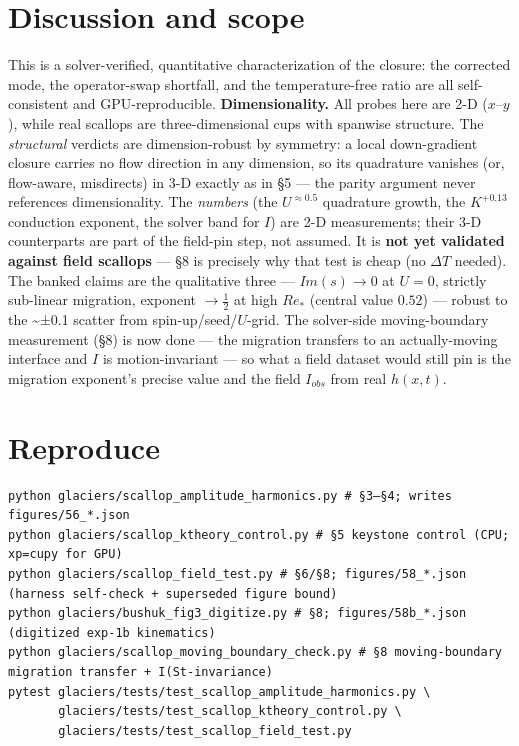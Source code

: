 \documentclass[tc, manuscript]{copernicus}
\begin{document}
\section{Discussion and scope}

This is a solver-verified, quantitative characterization of the closure: the corrected mode, the operator-swap shortfall, and the temperature-free ratio are all self-consistent and GPU-reproducible. \textbf{Dimensionality.} All probes here are 2-D ($x$--$y$), while real scallops are three-dimensional cups with spanwise structure. The \emph{structural} verdicts are dimension-robust by symmetry: a local down-gradient closure carries no flow direction in any dimension, so its quadrature vanishes (or, flow-aware, misdirects) in 3-D exactly as in §5 --- the parity argument never references dimensionality. The \emph{numbers} (the $U^{\approx 0.5}$ quadrature growth, the $K^{+0.13}$ conduction exponent, the solver band for $I$) are 2-D measurements; their 3-D counterparts are part of the field-pin step, not assumed. It is \textbf{not yet validated against field scallops} — §8 is precisely why that test is cheap (no $\Delta T$ needed). The banked claims are the qualitative three — $Im(s)\to 0$ at $U=0$, strictly sub-linear migration, exponent $\to \tfrac{1}{2}$ at high $Re_*$ (central value $0.52$) — robust to the \textasciitilde{}±0.1 scatter from spin-up/seed/$U$-grid. The solver-side moving-boundary measurement (§8) is now done — the migration transfers to an actually-moving interface and $I$ is motion-invariant — so what a field dataset would still pin is the migration exponent's precise value and the field $I_{obs}$ from real $h(x,t)$.

\section{Reproduce}

\begin{verbatim}
python glaciers/scallop_amplitude_harmonics.py # §3–§4; writes figures/56_*.json
python glaciers/scallop_ktheory_control.py # §5 keystone control (CPU; xp=cupy for GPU)
python glaciers/scallop_field_test.py # §6/§8; figures/58_*.json (harness self-check + superseded figure bound)
python glaciers/bushuk_fig3_digitize.py # §8; figures/58b_*.json (digitized exp-1b kinematics)
python glaciers/scallop_moving_boundary_check.py # §8 moving-boundary migration transfer + I(St-invariance)
pytest glaciers/tests/test_scallop_amplitude_harmonics.py \
       glaciers/tests/test_scallop_ktheory_control.py \
       glaciers/tests/test_scallop_field_test.py
\end{verbatim}
\end{document}
